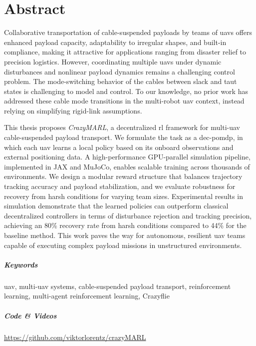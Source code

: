 \chapter*{Abstract}
\thispagestyle{empty}
Collaborative transportation of cable-suspended payloads by teams of \glspl{uav} offers enhanced payload capacity, adaptability to irregular shapes, and built-in compliance, making it attractive for applications ranging from disaster relief to precision logistics. However, coordinating multiple \glspl{uav} under dynamic disturbances and nonlinear payload dynamics remains a challenging control problem. The mode-switching behavior of the cables between slack and taut states is challenging to model and control. To our knowledge, no prior work has addressed these cable mode transitions in the multi-robot \gls{uav} context, instead relying on simplifying rigid-link assumptions. 

This thesis proposes \textit{CrazyMARL}, a decentralized \gls{rl} framework for multi-\gls{uav} cable-suspended payload transport. We formulate the task as a \gls{dec-pomdp}, in which each \gls{uav} learns a local policy based on its onboard observations and external positioning data. A high-performance GPU-parallel simulation pipeline, implemented in JAX and MuJoCo, enables scalable training across thousands of environments. We design a modular reward structure that balances trajectory tracking accuracy and payload stabilization, and we evaluate robustness for recovery from harsh conditions for varying team sizes. Experimental results in simulation demonstrate that the learned policies can outperform classical decentralized controllers in terms of disturbance rejection and tracking precision, achieving an 80\% recovery rate from harsh conditions compared to 44\% for the baseline method. This work paves the way for autonomous, resilient \gls{uav} teams capable of executing complex payload missions in unstructured environments.
\paragraph{Keywords}
\gls{uav}, multi-\gls{uav} systems, cable-suspended payload transport, reinforcement learning, multi-agent reinforcement learning, Crazyflie




\paragraph{Code \& Videos}
\url{https://github.com/viktorlorentz/crazyMARL}


